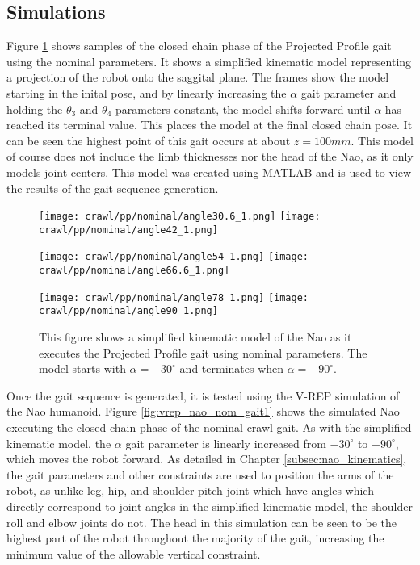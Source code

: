\subsection{Simulations}
Figure \ref{fig:pp_nom_gait1} shows samples of the closed chain phase of the Projected
Profile gait using the nominal parameters. It shows a simplified kinematic model
representing a projection of the robot onto the saggital plane. The frames show the
model starting in the inital pose, and by linearly increasing the $\alpha$ gait
parameter and holding the $\theta_3$ and $\theta_4$ parameters constant, the model
shifts forward until $\alpha$ has reached its terminal value. This places the model
at the final closed chain pose. It can be seen the highest point of this gait occurs
at about $z = 100 mm$. This model of course does not include the limb thicknesses nor
the head of the Nao, as it only models joint centers. This model was created using MATLAB
and is used to view the results of the gait sequence generation.

\begin{figure}
  \centerline{
    \texttt{[image: crawl/pp/nominal/angle30.6\_1.png]}
    \texttt{[image: crawl/pp/nominal/angle42\_1.png]}
  }
  \centerline{
    \texttt{[image: crawl/pp/nominal/angle54\_1.png]}
    \texttt{[image: crawl/pp/nominal/angle66.6\_1.png]}
  }
  \centerline{
    \texttt{[image: crawl/pp/nominal/angle78\_1.png]}
    \texttt{[image: crawl/pp/nominal/angle90\_1.png]}
  }
  \caption{This figure shows a simplified kinematic model of the Nao as it executes
           the Projected Profile gait using nominal parameters. The model starts with
           $\alpha = -30^\circ$ and terminates when $\alpha = -90^\circ$.}
  \label{fig:pp_nom_gait1}
\end{figure}


Once the gait sequence is generated, it is tested using the V-REP simulation of the
Nao humanoid. Figure \ref{fig:vrep_nao_nom_gait1} shows the simulated Nao executing
the closed chain phase of the nominal crawl gait. As with the simplified kinematic
model, the $\alpha$ gait parameter is linearly increased from $-30^\circ$ to $-90^\circ$,
which moves the robot forward. As detailed in Chapter \ref{subsec:nao_kinematics}, the
gait parameters and other constraints are used to position the arms of the robot, as unlike
leg, hip, and shoulder pitch joint which have angles which directly correspond to
joint angles in the simplified kinematic model, the shoulder roll and elbow joints
do not. The head in this simulation can be seen to be the highest part of the robot
throughout the majority of the gait, increasing the minimum value of the allowable
vertical constraint.


